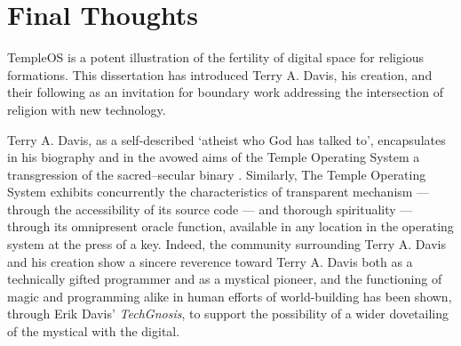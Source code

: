 \documentclass[Draft.tex]{subfiles}
\begin{document}
\chapter*{Final Thoughts}

TempleOS is a potent illustration of the fertility of digital space
for religious formations.
This dissertation has introduced Terry A. Davis, his creation, and their
following as an invitation for boundary work addressing the intersection
of religion with new technology.

Terry A. Davis, as a self-described `atheist who God has talked to',
encapsulates in his biography and in the avowed aims of the
Temple Operating System a transgression of
the sacred--secular binary \parencite{Atheist}.
Similarly, The Temple Operating System exhibits concurrently the characteristics
of transparent mechanism --- through the accessibility of its source code ---
and thorough spirituality --- through its omnipresent oracle function, available
in any location in the operating system at the press of a key.
Indeed, the community surrounding Terry A. Davis and his creation show a sincere
reverence toward Terry A. Davis both as a technically gifted programmer and as a
mystical pioneer, and the functioning of magic and programming alike in human
efforts of world-building has been shown, through Erik Davis' \textit{TechGnosis},
to support the possibility of a wider dovetailing of the mystical with the digital.
\end{document}
